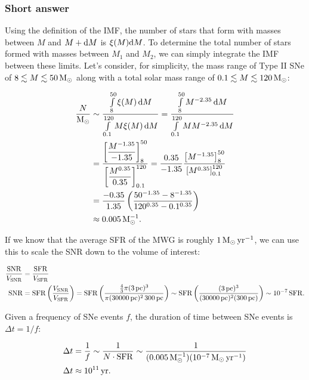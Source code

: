 \documentclass[a4paper,10pt]{article}
\begin{document}
\subsubsection{Short answer}

Using the definition of the IMF, the number of stars that form with masses between $M$ and $M+{\rm d}M$ is $\xi(M){\rm d}M$. To determine the total number of stars formed with masses between $M_1$ and $M_2$, we can simply integrate the IMF between these limits. Let's consider, for simplicity, the mass range of Type II SNe of $8\lesssim M\lesssim 50\,{\rm M_\odot}$ along with a total solar mass range of $0.1\lesssim M\lesssim 120\,{\rm M_\odot}$:

\begin{align*}
    \frac{N}{\rm M_\odot} &\sim \frac{\int\limits_8^{50}\xi(M)\,{\rm d}M}{\int\limits_{0.1}^{120}M\xi(M)\,{\rm d}M} = \frac{\int\limits_8^{50}M^{-2.35}\,{\rm d}M}{\int\limits_{0.1}^{120}MM^{-2.35}\,{\rm d}M} \\
    &= \dfrac{\left[\dfrac{M^{-1.35}}{-1.35}\right]_8^{50}}{\left[\dfrac{M^{0.35}}{0.35}\right]_{0.1}^{120}} = \frac{0.35}{-1.35} \dfrac{\left[M^{-1.35}\right]_8^{50}}{\left[M^{0.35}\right]_{0.1}^{120}} \\
    &= \frac{-0.35}{1.35} \left(\dfrac{50^{-1.35}-8^{-1.35}}{120^{0.35}-0.1^{0.35}}\right) \\
    &\approx 0.005\,{\rm M_\odot^{-1}}.
\end{align*}

{\noindent}If we know that the average SFR of the MWG is roughly $1\,{\rm M_\odot\,yr^{-1}}$, we can use this to scale the SNR down to the volume of interest:

\begin{align*}
    \frac{\rm SNR}{V_{\rm SNR}} &= \frac{\rm SFR}{V_{\rm SFR}} \\
    {\rm SNR} &= {\rm SFR} \left(\frac{V_{\rm SNR}}{V_{\rm SFR}}\right) = {\rm SFR} \left(\frac{\frac{4}{3}\pi(3\,{\rm pc})^3}{\pi(30000\,{\rm pc})^2\,300\,{\rm pc}}\right) \sim {\rm SFR} \left(\frac{(3\,{\rm pc})^3}{(30000\,{\rm pc})^2(300\,{\rm pc})}\right) \sim 10^{-7}\,{\rm SFR}.
\end{align*}

{\noindent}Given a frequency of SNe events $f$, the duration of time between SNe events is $\Delta t=1/f$:

\begin{align*}
    \Delta t &= \frac{1}{f} \sim \frac{1}{N\cdot{\rm SFR}} \sim \frac{1}{(0.005\,{\rm M_\odot^{-1}})(10^{-7}\,{\rm M_\odot\,yr^{-1}})} \\
    \Delta t &\approx 10^{11}\,{\rm yr}.
\end{align*}
\end{document}
